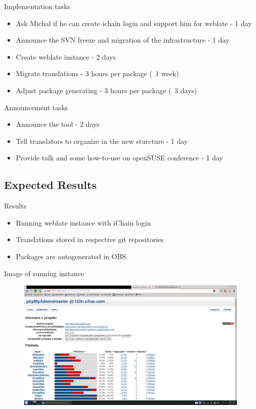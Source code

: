 \documentclass{beamer}
\begin{document}
\begin{frame}[t]{Implementation tasks}
	\begin{itemize}
	\item Ask Michal if he can create ichain login and support him for weblate - 1 day
	\item Announce the SVN freeze and migration of the infrastructure - 1 day
	\item Create weblate instance - 2 days
	\item Migrate translations - 3 hours per package (~1 week)
	\item Adjust package generating - 3 hours per package (~3 days)
	\end{itemize}
\end{frame}

\begin{frame}[t]{Announcement tasks}
	\begin{itemize}
	\item Announce the tool - 2 days
	\item Tell translators to organize in the new sturcture - 1 day
	\item Provide talk and some how-to-use on openSUSE conference - 1 day
	\end{itemize}
\end{frame}

\subsection{Expected Results}

\begin{frame}[t]{Results}
	\begin{itemize}
	\item Running weblate instance with iChain login
	\item Translations stored in respective git repositories
	\item Packages are autogenerated in OBS.
	\end{itemize}
\end{frame}

\begin{frame}{Image of running instance}
        \begin{figure}
        \includegraphics[width= 1.0\linewidth]{weblate.png}
        \end{figure}
\end{frame}
\end{document}
